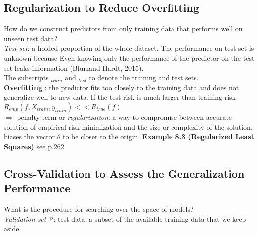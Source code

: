 \subsection{Regularization to Reduce Overfitting}
How do we construct predictors from only training data that performs well on unseen test data?\\
\textit{Test set}: a holded proportion of the whole dataset.
The performance on test set is unknown because Even knowing only the performance of the predictor on the test set leaks information (Blumand Hardt, 2015).\\
The subscripts $_{train}$ and $_{test}$ to denote the training and test sets.\\
\textbf{Overfitting} : the predictor fits too closely to the training data and does not generalize well to new data. If the test risk is much larger than training risk
$R_{emp} (f, X_{train}, y_{train}) << R_{true} (f)$ \\
$\Rightarrow$ penalty term or \textit{regularization}: a way to compromise between accurate solution of empirical risk minimization and the size or complexity of the solution. biases the vector $\theta$ to be closer to the origin.
\textbf{Example 8.3 (Regularized Least Squares)} see p.262

\subsection{Cross-Validation to Assess the Generalization Performance}
What is the procedure for searching over the space of models?\\
\textit{Validation set $\mathcal{V}$}: test data. a subset of the available training data that we keep aside.
 
